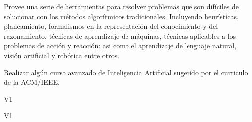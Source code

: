 \begin{syllabus}


\begin{justification}
Provee una serie de herramientas para resolver problemas que son difíciles de solucionar con los métodos algorítmicos tradicionales. Incluyendo heurísticas, planeamiento, formalismos en la representación del conocimiento y del razonamiento, técnicas de aprendizaje de máquinas, técnicas aplicables a los problemas de acción y reacción: asi como el aprendizaje de lenguaje natural, visión artificial y robótica entre otros. 
\end{justification}

\begin{goals}
\item Realizar algún curso avanzado de Inteligencia Artificial sugerido por el curriculo de la ACM/IEEE.
\end{goals}

\begin{outcomes}{V1}
\item {}
\item {}
\item {}
\item {}
\end{outcomes}

\begin{competences}{V1}
\item {} 
\item {} 
\item {}
\end{competences}


\end{syllabus}
